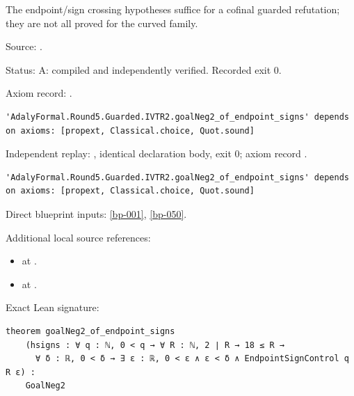 \begin{theorem}[bp-053]
\label{bp-053}
\leanok
The endpoint/sign crossing hypotheses suffice for a cofinal guarded refutation; they are not all proved for the curved family.

\par Source: \texttt{}.
\par Status: A: compiled and independently verified. Recorded exit 0.
\par Axiom record: \texttt{}.
\begin{verbatim}
'AdalyFormal.Round5.Guarded.IVTR2.goalNeg2_of_endpoint_signs' depends on axioms: [propext, Classical.choice, Quot.sound]
\end{verbatim}
\par Independent replay: \texttt{}, identical declaration body, exit 0; axiom record \texttt{}.
\begin{verbatim}
'AdalyFormal.Round5.Guarded.IVTR2.goalNeg2_of_endpoint_signs' depends on axioms: [propext, Classical.choice, Quot.sound]
\end{verbatim}
\par Direct blueprint inputs: \ref{bp-001}, \ref{bp-050}.
\par Additional local source references:
\begin{itemize}
\item \texttt{} at \texttt{}.
\item \texttt{} at \texttt{}.
\end{itemize}
\par Exact Lean signature:
\begin{verbatim}
theorem goalNeg2_of_endpoint_signs
    (hsigns : ∀ q : ℕ, 0 < q → ∀ R : ℕ, 2 ∣ R → 18 ≤ R →
      ∀ δ : ℝ, 0 < δ → ∃ ε : ℝ, 0 < ε ∧ ε < δ ∧ EndpointSignControl q R ε) :
    GoalNeg2
\end{verbatim}
\end{theorem}

